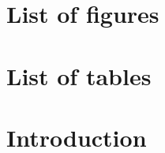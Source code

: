 \documentclass[a4paper,11pt,twoside]{report}
\begin{document}
\setcounter{page}{1}


\tableofcontents


\chapter*{List of figures}


\chapter*{List of tables}


\chapter{Introduction}
\end{document}
